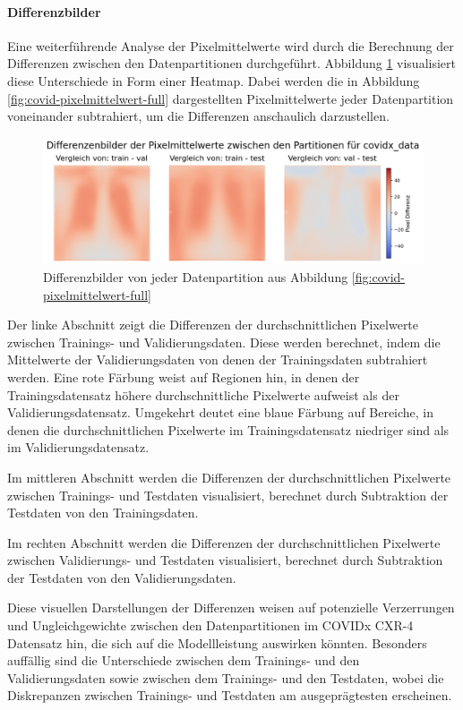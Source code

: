 \paragraph{Differenzbilder} \label{chap:COVID19-differenzbilder}
Eine weiterführende Analyse der Pixelmittelwerte wird durch die Berechnung der Differenzen zwischen den Datenpartitionen durchgeführt. Abbildung \ref{fig:differenz-datapartition-covid} visualisiert diese Unterschiede in Form einer Heatmap. Dabei werden die in Abbildung \ref{fig:covid-pixelmittelwert-full} dargestellten Pixelmittelwerte jeder Datenpartition voneinander subtrahiert, um die Differenzen anschaulich darzustellen.

\begin{figure}[H]
    \centering
    \includegraphics[width=\linewidth]{01-images/03-data/covidx-differenzenbilder.png}
    \caption{Differenzbilder von jeder Datenpartition aus Abbildung \ref{fig:covid-pixelmittelwert-full}}
    \label{fig:differenz-datapartition-covid}
\end{figure}

Der linke Abschnitt zeigt die Differenzen der durchschnittlichen Pixelwerte zwischen Trainings- und Validierungsdaten. Diese werden berechnet, indem die Mittelwerte der Validierungsdaten von denen der Trainingsdaten subtrahiert werden. Eine rote Färbung weist auf Regionen hin, in denen der Trainingsdatensatz höhere durchschnittliche Pixelwerte aufweist als der Validierungsdatensatz. Umgekehrt deutet eine blaue Färbung auf Bereiche, in denen die durchschnittlichen Pixelwerte im Trainingsdatensatz niedriger sind als im Validierungsdatensatz.

Im mittleren Abschnitt werden die Differenzen der durchschnittlichen Pixelwerte zwischen Trainings- und Testdaten visualisiert, berechnet durch Subtraktion der Testdaten von den Trainingsdaten. 

Im rechten Abschnitt werden die Differenzen der durchschnittlichen Pixelwerte zwischen Validierungs- und Testdaten visualisiert, berechnet durch Subtraktion der Testdaten von den Validierungsdaten.

Diese visuellen Darstellungen der Differenzen weisen auf potenzielle Verzerrungen und Ungleichgewichte zwischen den Datenpartitionen im COVIDx CXR-4 Datensatz hin, die sich auf die Modellleistung auswirken könnten. Besonders auffällig sind die Unterschiede zwischen dem Trainings- und den Validierungsdaten sowie zwischen dem Trainings- und den Testdaten, wobei die Diskrepanzen zwischen Trainings- und Testdaten am ausgeprägtesten erscheinen.

\newpage